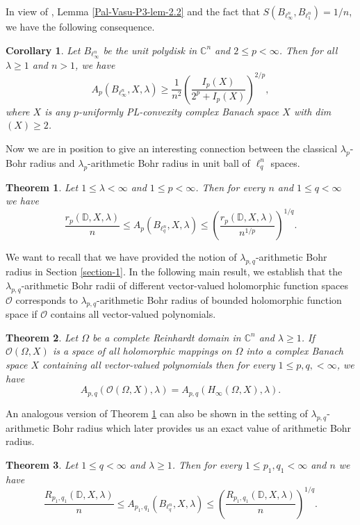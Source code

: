 \documentclass[a4paper,12pt]{amsart}
\newtheorem{thm}{Theorem}[section]
\newtheorem{cor}[equation]{Corollary}
\theoremstyle{definition}
\newcounter {own}
\begin{document}
In view of \cite[Theorem 1.5]{das-2023}, Lemma \ref{Pal-Vasu-P3-lem-2.2} and the fact that $S(B_{\ell^n_{\infty}}, B_{\ell^n_1})=1/n$, we have the following consequence.
\begin{cor}
	Let $B_{\ell^n_{\infty}}$ be the unit polydisk in $\mathbb{C}^n$ and $2\leq p<\infty$. Then for all $\lambda \geq 1$ and $n>1$, we have
	\begin{equation*}
		A_p(B_{\ell^n_{\infty}},X, \lambda)\geq \frac{1}{n^2} \left(\frac{I_p(X)}{2^p+I_p(X)}\right)^{2/p},
	\end{equation*}
where $X$ is any $p$-uniformly PL-convexity complex Banach space $X$ with dim$(X)\geq 2$.
\end{cor}

Now we are in position to give an interesting connection between the classical $\lambda_{p}$-Bohr radius and  $\lambda_p$-arithmetic Bohr radius in unit ball of $\ell^n_q$ spaces.

\begin{thm}\label{Pal-Vasu-P3-thm-2.4}
	Let $1\leq \lambda <\infty$ and $1\leq p<\infty$. Then for every $n$ and $1\leq q<\infty$ we have 
	\begin{equation*}
		\frac{r_p(\mathbb{D},X,\lambda)}{n}\leq A_p(B_{\ell^n_q},X,\lambda)\leq \left(\frac{r_p(\mathbb{D},X,\lambda)}{n^{1/p}}\right)^{1/q}.
	\end{equation*}
\end{thm}


We want to recall that we have provided the notion of $\lambda_{p,q}$-arithmetic Bohr radius in Section \ref{section-1}. In the following main result, we establish that the $\lambda_{p,q}$-arithmetic Bohr radii of different vector-valued holomorphic function spaces $\mathcal{O}$ corresponds to $\lambda_{p,q}$-arithmetic Bohr radius of bounded holomorphic function space if  $\mathcal{O}$ contains all vector-valued polynomials.
\begin{thm}\label{Pal-Vasu-P3-thm-2.6}
	Let $\Omega$ be a complete Reinhardt domain in $\mathbb{C}^n$ and $\lambda\geq 1$. If $\mathcal{O}(\Omega, X)$ is a space of all holomorphic mappings on $\Omega$ into a complex Banach space $X$ containing all vector-valued polynomials then for every $1\leq p,q, <\infty$, we have
	\begin{equation*}
		A_{p,q}(\mathcal{O}(\Omega, X), \lambda)=A_{p,q}(H_{\infty}(\Omega, X), \lambda).
	\end{equation*}
\end{thm}
An analogous version of Theorem \ref{Pal-Vasu-P3-thm-2.4} can also be shown in the setting of $\lambda_{p,q}$-arithmetic Bohr radius which later provides us an exact value of arithmetic Bohr radius.
\begin{thm}\label{Pal-Vasu-P3-thm-2.7}
	Let $1\leq q < \infty$ and $\lambda \geq 1$. Then for every $1\leq p_{1}, q_{1}< \infty$ and $n$ we have 
	\begin{equation*}
		\frac{R_{p_{1}, q_{1}}(\mathbb{D}, X,\lambda)}{n}\leq A_{p_1,q_1}(B_{\ell^n_{q}}, X,\lambda) \leq \left(\frac{R_{p_{1}, q_{1}}(\mathbb{D}, X,\lambda)}{n}\right)^{1/q}. 
	\end{equation*}
\end{thm}
\end{document}
